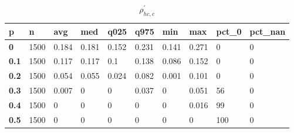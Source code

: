 \begin{table}[h]
 \centering 
\footnotesize
\caption{$\rho_{hc,c}^\prime $}
\label{tab:alphahcc}
\begin{tabular}[h]{|l|l|l|l|l|l|l|l|l|l|
    } \hline
\textbf{ p} & \textbf{ n} & \textbf{ avg} & \textbf{ med} & \textbf{ q025} & \textbf{ q975} & \textbf{ min} & \textbf{ max} & \textbf{ pct\_0} & \textbf{ pct\_nan}
    \\ \hline
  \textbf{  0} & 1500 & 0.184 & 0.181 & 0.152 & 0.231 & 0.141 & 0.271 &   0 & 0
    \\ \hline
  \textbf{0.1} & 1500 & 0.117 & 0.117 &   0.1 & 0.138 & 0.086 & 0.152 &   0 & 0
    \\ \hline
  \textbf{0.2} & 1500 & 0.054 & 0.055 & 0.024 & 0.082 & 0.001 & 0.101 &   0 & 0
    \\ \hline
  \textbf{0.3} & 1500 & 0.007 &     0 &     0 & 0.037 &     0 & 0.051 &  56 & 0
    \\ \hline
  \textbf{0.4} & 1500 &     0 &     0 &     0 &     0 &     0 & 0.016 &  99 & 0
    \\ \hline
  \textbf{0.5} & 1500 &     0 &     0 &     0 &     0 &     0 &     0 & 100 & 0
    \\ \hline
 \end{tabular}
 \end{table}
